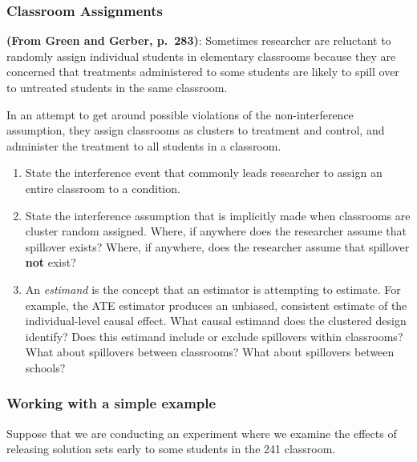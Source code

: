 \documentclass[
]{article}
\providecommand{\tightlist}{%
  \setlength{\itemsep}{0pt}\setlength{\parskip}{0pt}}
\theoremstyle{definition}
\theoremstyle{definition}
\theoremstyle{definition}
\theoremstyle{definition}
\theoremstyle{remark}
\begin{document}
\subsubsection{Classroom Assignments}\label{classroom-assignments}

\textbf{(From Green and Gerber, p.~283)}: Sometimes researcher are reluctant to randomly assign individual students in elementary classrooms because they are concerned that treatments administered to some students are likely to spill over to untreated students in the same classroom.

In an attempt to get around possible violations of the non-interference assumption, they assign classrooms as clusters to treatment and control, and administer the treatment to all students in a classroom.

\begin{enumerate}
\def\labelenumi{\arabic{enumi}.}
\tightlist
\item
  State the interference event that commonly leads researcher to assign an entire classroom to a condition.
\item
  State the interference assumption that is implicitly made when classrooms are cluster random assigned. Where, if anywhere does the researcher assume that spillover exists? Where, if anywhere, does the researcher assume that spillover \textbf{not} exist?
\item
  An \emph{estimand} is the concept that an estimator is attempting to estimate. For example, the ATE estimator produces an unbiased, consistent estimate of the individual-level causal effect. What causal estimand does the clustered design identify? Does this estimand include or exclude spillovers within classrooms? What about spillovers between classrooms? What about spillovers between schools?
\end{enumerate}

\subsubsection{Working with a simple example}\label{working-with-a-simple-example}

Suppose that we are conducting an experiment where we examine the effects of releasing solution sets early to some students in the 241 classroom.
\end{document}
